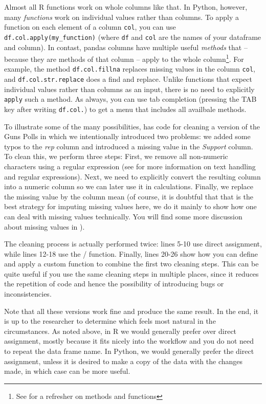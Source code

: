 Almost all R functions work on whole columns like that.
In Python, however, many \emph{functions} work on individual values rather than columns.
To apply a function on each element of a column \verb+col+, you can use \verb+df.col.apply(my_function)+
(where \texttt{df} and \texttt{col} are the names of your dataframe and column).
In contast, pandas columns have multiple useful \emph{methods} that -- because they are methods
of that column -- apply to the whole column\footnote{See  for a refresher on methods and functions}.
For example, the method \verb+df.col.fillna+ replaces
missing values in the column \verb+col+, and \verb+df.col.str.replace+ does a find and replace.
Unlike functions that expect individual values rather than columns as an input, there is no need to explicitly \verb+apply+ such a method. 
As always, you can use tab completion (pressing the TAB key after writing \texttt{df.col.}) to get a menu that includes all availbale methods.


To illustrate some of the many possibilities,  has code for cleaning a version of the Guns Polls
in which we intentionally introduced two problems: we added some typos to the \emph{rep} column
and introduced a missing value in the \emph{Support} column.
To clean this, we perform three steps: First, we remove all non-numeric characters using a regular expression
(see  for more information on text handling and regular expressions).
Next, we need to explicitly convert the resulting column into a numeric column so we can later use it in calculations.
Finally, we replace the missing value by the column mean
(of course, it is doubtful that that is the best strategy for imputing missing values here,
we do it mainly to show how one can deal with missing values technically. You will find some more discussion about missing values in ).

The cleaning process is actually performed twice: lines 5-10 use direct assignment,
while lines 12-18 use the / function.
Finally, lines 20-26 show how you can define and apply a custom function to combine the first two cleaning steps.
This can be quite useful if you use the same cleaning steps in multiple places,
since it reduces the repetition of code and hence the possibility of introducing bugs or inconsistencies. 

Note that all these versions work fine and produce the same result.
In the end, it is up to the researcher to determine which feels most natural in the circumstances.
As noted above, in R we would generally prefer  over direct assignment,
mostly because it fits nicely into the  workflow and you do not need to repeat the data frame name.
In Python, we would generally prefer the direct assignment, unless it is desired to make a copy of the data
with the changes made, in which case  can be more useful. 



